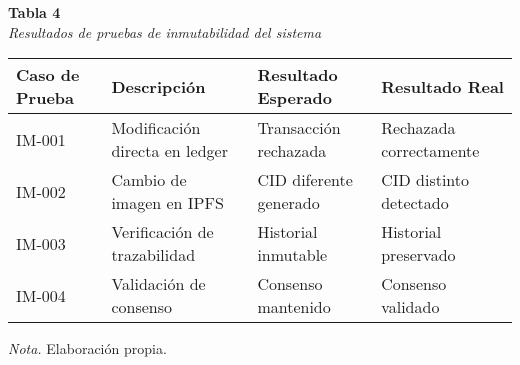 \begin{table}[htbp]
    \begin{flushleft}
        \textbf{Tabla 4}\\[2em]
        \textit{Resultados de pruebas de inmutabilidad del sistema}
    \end{flushleft}
    \vspace{1em}
    \centering
    \begin{tabular}{p{3cm} p{4cm} p{3cm} p{3cm}}
        \toprule
        \textbf{Caso de Prueba} & \textbf{Descripción} & \textbf{Resultado Esperado} & \textbf{Resultado Real} \\
        \midrule
        IM-001 & Modificación directa en ledger & Transacción rechazada & Rechazada correctamente \\
        IM-002 & Cambio de imagen en IPFS & CID diferente generado & CID distinto detectado \\
        IM-003 & Verificación de trazabilidad & Historial inmutable & Historial preservado \\
        IM-004 & Validación de consenso & Consenso mantenido & Consenso validado \\
        \bottomrule
    \end{tabular}
    \vspace{2em}
    \begin{flushleft}
        \textit{Nota.} Elaboración propia.
    \end{flushleft}
    \label{tab:resultados_inmutabilidad}
\end{table} 